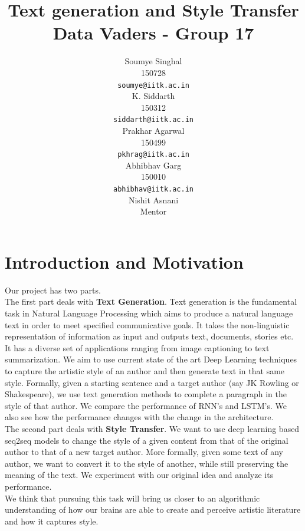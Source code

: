\documentclass{article} %
\title{Text generation and Style Transfer\\Data Vaders - Group 17}
\author{
Soumye Singhal \\
150728 \\
\texttt{soumye@iitk.ac.in}\\
\And
K. Siddarth \\
150312 \\
\texttt{siddarth@iitk.ac.in}\\
\And
Prakhar Agarwal \\
150499 \\
\texttt{pkhrag@iitk.ac.in}\\
\AND
Abhibhav Garg \\
150010 \\
\texttt{abhibhav@iitk.ac.in}\\
\And
Nishit Asnani \\
Mentor
}
\begin{document}
\maketitle

\section{Introduction and Motivation}
Our project has two parts.\\
The first part deals with \textbf{Text Generation}. Text generation is the fundamental task in Natural Language Processing which aims to produce a natural language text in order to meet specified communicative goals. It takes the non-linguistic representation of information as input and outputs text, documents, stories etc. It has a diverse set of applications ranging from image captioning to text summarization. We aim to
use current state of the art Deep Learning techniques to capture the artistic style of an author and
then generate text in that same style.  Formally, given a starting sentence and a target author (say
JK Rowling or Shakespeare), we use text generation methods to complete a paragraph in the style of
that author. We compare the performance of RNN's and LSTM's. We also see how the performance changes with the change in the architecture.\\
The second part deals with \textbf{Style Transfer}. We want to use deep learning based seq2seq models to change the style of a given content from that of the original author to that of a new target author. More formally, given some text of any author, we want to convert it to the style of another, while still preserving the meaning of the text. We experiment with our original idea and analyze its performance.\\
We think that pursuing this task will bring us closer to an algorithmic understanding of how our brains are able to create and perceive artistic literature and how it captures style.





\end{document}
